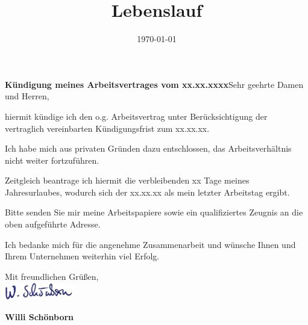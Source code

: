 \documentclass[11pt,a4paper,sans]{moderncv} %
\title{Lebenslauf}
\begin{document}


\clearpage

\date{\today} %
\opening{\textbf{Kündigung meines Arbeitsvertrages vom xx.xx.xxxx}\newline{}\newline{}Sehr geehrte Damen und Herren,} %
\closing{} %

\makelettertitle %

hiermit kündige ich den o.g. Arbeitsvertrag unter Berücksichtigung der vertraglich vereinbarten Kündigungsfrist zum xx.xx.xx.
 
Ich habe mich aus privaten Gründen dazu entschlossen, das Arbeitsverhältnis nicht weiter fortzuführen.
 
Zeitgleich beantrage ich hiermit die verbleibenden xx Tage meines Jahresurlaubes, wodurch sich der xx.xx.xx als mein letzter Arbeitstag ergibt.
 
Bitte senden Sie mir meine Arbeitspapiere sowie ein qualifiziertes Zeugnis an die oben aufgeführte Adresse. 

Ich bedanke mich für die angenehme Zusammenarbeit und wünsche Ihnen und Ihrem Unternehmen weiterhin viel Erfolg.

Mit freundlichen Grüßen,\\[1.5em]
\includegraphics[width=3cm]{pictures/signature}

\bfseries{Willi Schönborn}


\end{document}
